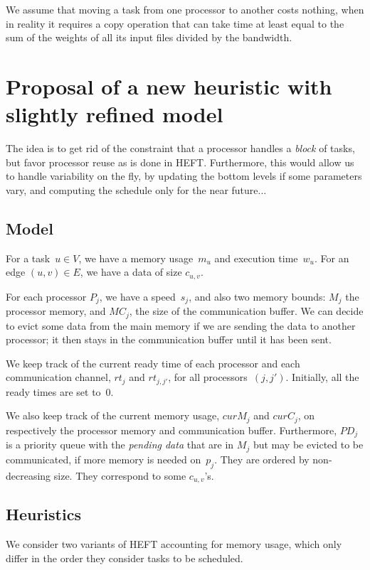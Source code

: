 \documentclass[sigconf,review,anonymous]{acmart}
\newcommand{\MM}{M}
\newcommand{\MC}{MC}
\newcommand{\rt}{rt}
\newcommand{\curM}{curM}
\newcommand{\curC}{curC}
\newcommand{\PD}{PD}
\begin{document}
    We assume that moving a task from one processor to another costs nothing, when in reality it requires a copy
    operation that can take time at least equal to the sum of the weights of all its input files divided by the bandwidth.


\section{Proposal of a new heuristic with slightly refined model}

The idea is to get rid of the constraint that a processor handles a {\em block} of tasks,
but favor processor reuse as is done in HEFT. 
Furthermore, this would allow us to handle variability on the fly, by updating
the bottom levels if some parameters vary, and computing the schedule
only for the near future...

\subsection{Model}

For a task~$u\in V$, we have a memory usage~$m_u$ and execution time~$w_u$.
For an  edge $(u,v)\in E$, we have a data of size $c_{u,v}$. 

For each processor $P_j$, we have a speed~$s_j$, and also two memory bounds: 
$\MM_j$ the processor memory, and $\MC_j$, the size of the communication buffer.
We can decide to evict some data from the main memory if we are sending the data
to another processor; it then stays in the communication buffer until it has been sent.

We keep track of the current ready time of each processor and each communication
channel, $\rt_j$ and $\rt_{j,j'}$, for all processors~$(j,j')$. Initially, all the ready times
are set to~$0$. 

We also keep track of the current memory usage, $\curM_j$ and $\curC_j$,
on respectively the processor memory and communication buffer. 
Furthermore, $\PD_j$ is a priority queue with the {\em pending data} 
that are in $\MM_j$ but may be evicted to be communicated, if 
more memory is needed on~$p_j$. They are ordered by non-decreasing size. 
They correspond to some $c_{u,v}$'s. 



\subsection{Heuristics}

We consider two variants of HEFT accounting for memory usage, which only
differ in the order they consider tasks to be scheduled.
\end{document}
